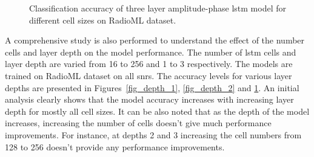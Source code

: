 \begin{figure}[htb]
\caption{Classification accuracy of three layer amplitude-phase \ac{lstm} model for different cell sizes on RadioML dataset.}
\label{fig_depth_3}
\end{figure}

A comprehensive study is also performed to understand the effect of the number cells and layer depth on the model performance. The number of \ac{lstm} cells and layer depth are varied from 16 to 256 and  1 to 3 respectively. The models are trained on RadioML dataset on all \ac{snr}s. The accuracy levels for various layer depths are presented in Figures~\ref{fig_depth_1}, \ref{fig_depth_2} and \ref{fig_depth_3}. An initial analysis clearly shows that the model accuracy increases with increasing layer depth for mostly all cell sizes. It can be also noted that as the depth of the model increases, increasing the number of cells doesn't give much performance improvements. For instance, at depths 2 and 3 increasing the cell numbers from 128 to 256 doesn't provide any performance improvements.





